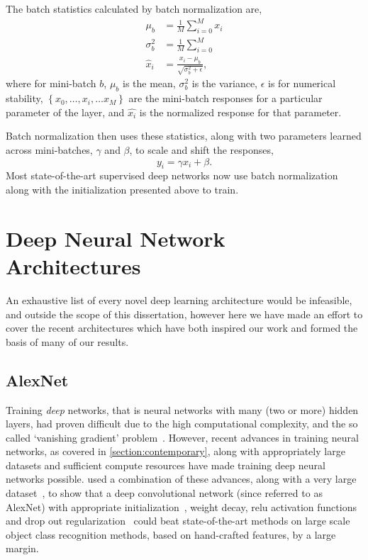 \documentclass[thesis]{subfiles}
\begin{document}
The batch statistics calculated by batch normalization are,
\begin{equation}
\begin{aligned}
    \mu_b &= \frac{1}{M} \sum^M_{i=0} x_i\\
    \sigma^2_b &= \frac{1}{M} \sum^M_{i=0}\\
    \hat{x}_i &= \frac{x_i - \mu_b}{\sqrt{\sigma^2_b + \epsilon}},
\end{aligned}
\end{equation}
where for mini-batch $b$, $\mu_b$ is the mean, $\sigma^2_b$ is the variance, $\epsilon$ is for numerical stability, $\left\{x_0, \ldots, x_i, \ldots x_M\right\}$ are the mini-batch responses for a particular parameter of the layer, and $\hat{x_i}$ is the normalized response for that parameter. 

Batch normalization then uses these statistics, along with two parameters learned across mini-batches, $\gamma$ and $\beta$, to scale and shift the responses,
\begin{equation}    
    y_i = \gamma \hat{x_i} + \beta.
\end{equation}
%
Most state-of-the-art supervised deep networks now use batch normalization along with the initialization presented above to train.
\section{Deep Neural Network Architectures}
An exhaustive list of every novel deep learning architecture would be infeasible, and outside the scope of this dissertation, however here we have made an effort to cover the recent architectures which have both inspired our work and formed the basis of many of our results.

\subsection{AlexNet}
Training \emph{deep} networks, that is neural networks with many (\ie two or more) hidden layers, had proven difficult due to the high computational complexity, and the so called `vanishing gradient' problem~\citep{bengio:ieeenn94}. However, recent advances in training neural networks, as covered in \cref{section:contemporary}, along with appropriately large datasets and sufficient compute resources have made training deep neural networks possible. \citet{Krizhevsky2012} used a combination of these advances, along with a very large dataset~\citep{ILSVRC2015}, to show that a deep convolutional network (since referred to as AlexNet) with appropriate initialization~\citep{Sutskever2013momentum}, weight decay, \gls{relu} activation functions~\citep{conf/icml/NairH10} and drop out regularization~\citep{Hinton2012} could beat state-of-the-art methods on large scale object class recognition methods, based on hand-crafted features, by a large margin. 
\end{document}

